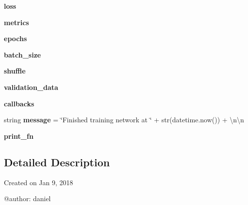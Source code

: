\begin{DoxyCompactItemize}
{\bfseries loss}
\item 
\mbox{\label{namespaceTrainModels_a6ff2682be67a40f553a1801f69f85f26}} 
{\bfseries metrics}
\item 
\mbox{\label{namespaceTrainModels_af2c2dea367d702db60c078667cf2eaea}} 
{\bfseries epochs}
\item 
\mbox{\label{namespaceTrainModels_a92637a2537af19f015ba2666fb8c6117}} 
{\bfseries batch\+\_\+size}
\item 
\mbox{\label{namespaceTrainModels_a936e377cde3b4ab7e92a90cf035c6a35}} 
{\bfseries shuffle}
\item 
\mbox{\label{namespaceTrainModels_a5cafabc3d9c8f3b4e437dd6c3b8e6ba9}} 
{\bfseries validation\+\_\+data}
\item 
\mbox{\label{namespaceTrainModels_a558f6c19a7082301c13f8a1b6eab1578}} 
{\bfseries callbacks}
\item 
\mbox{\label{namespaceTrainModels_a2a441954e4be8ff98449c8fa66dc004b}} 
string {\bfseries message} = \char`\"{}Finished training network at \char`\"{} + str(datetime.\+now()) + \textquotesingle{}\textbackslash{}n\textbackslash{}n\textquotesingle{}
\item 
\mbox{\label{namespaceTrainModels_aba63ee2817e2a1983cf68d6dd26ed116}} 
{\bfseries print\+\_\+fn}
\end{DoxyCompactItemize}


\subsection{Detailed Description}
\begin{DoxyVerb}Created on Jan 9, 2018

@author: daniel
\end{DoxyVerb}
 